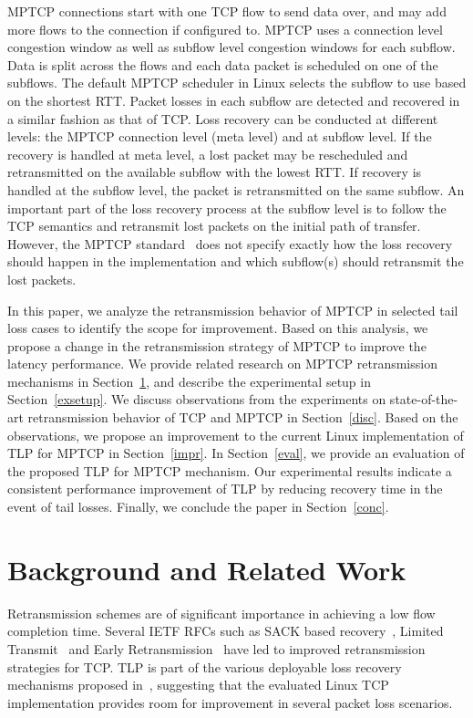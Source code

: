 \documentclass[10pt,conference]{IEEEtran}
\begin{document}
 MPTCP connections start with one TCP flow to send data over, and may add more flows to the connection if configured to. MPTCP uses a connection 
 level congestion window as well as subflow level congestion windows for each subflow. Data is split across the flows and each data packet is 
 scheduled on one of the subflows. The default MPTCP scheduler in Linux selects the subflow to use based on the shortest RTT. Packet losses in each subflow are detected and recovered in a similar fashion as that of 
 TCP. Loss recovery can be conducted at different levels: the MPTCP connection level (meta level) and at subflow level. If the recovery is handled 
 at meta level, a lost packet may be rescheduled and retransmitted on the available subflow with the lowest RTT. If recovery is handled at the 
 subflow level, the packet is retransmitted on the same subflow. An important part of the loss recovery process at the subflow level is to follow 
 the TCP semantics and retransmit lost packets on the initial path of transfer. However, the MPTCP standard~\cite{rfc6824} does not specify exactly 
 how the loss recovery should happen in the implementation and which subflow(s) should retransmit the lost packets.


In this paper, we analyze the retransmission behavior of MPTCP in selected tail loss cases to identify the scope for improvement. Based on this analysis, we propose a 
change in the retransmission strategy of MPTCP to improve the latency performance. We provide related research on MPTCP retransmission mechanisms in 
Section~\ref{relwork}, and describe the experimental setup in Section~\ref{exsetup}. We discuss observations from the experiments on
state-of-the-art retransmission behavior of TCP and MPTCP in Section~\ref{disc}. Based on the observations, we propose an improvement to the current 
Linux implementation of TLP for MPTCP in Section~\ref{impr}. In Section~\ref{eval}, we provide an evaluation of the proposed TLP for MPTCP 
mechanism. Our experimental results indicate a consistent performance improvement of TLP by reducing 
recovery time in the event of tail losses. Finally, we conclude the paper in Section~\ref{conc}. 
 
\section{Background and Related Work}\label{relwork}

Retransmission schemes are of significant importance in achieving a low flow completion time. Several IETF RFCs such as SACK based 
recovery~\cite{rfc6675}, Limited Transmit~\cite{rfc3042} and Early Retransmission~\cite{rfc5827} have led to improved retransmission 
strategies for TCP. TLP is part of the various deployable loss recovery mechanisms proposed in~\cite{Flach:2013}, suggesting that the evaluated 
Linux TCP implementation provides room for improvement in several packet loss scenarios. 
\end{document}
